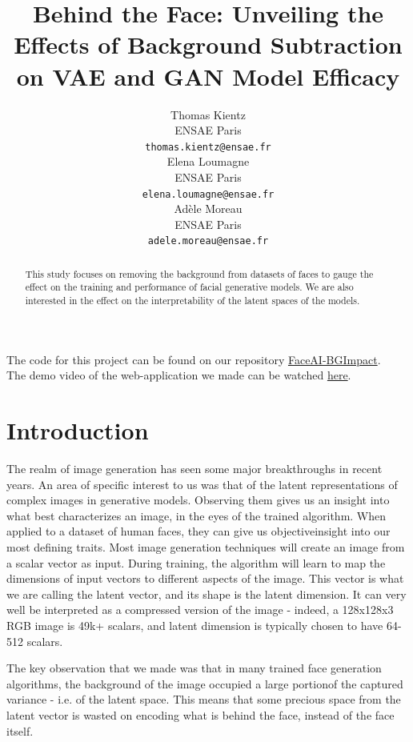 \documentclass{article}
\title{Behind the Face: Unveiling the Effects of Background Subtraction on VAE and GAN Model Efficacy}
\author{%
  Thomas Kientz \\
  ENSAE Paris\\
  \texttt{thomas.kientz@ensae.fr} \\
  \And
  Elena Loumagne \\
  ENSAE Paris\\
  \texttt{elena.loumagne@ensae.fr} \\
  \AND
  Adèle Moreau \\
  ENSAE Paris\\
  \texttt{adele.moreau@ensae.fr} \\
}
\begin{document}
\maketitle

\begin{abstract}
  This study focuses on removing the background from datasets of faces to gauge the effect on the training and performance of facial generative models. We are also interested in the effect on the interpretability of the latent spaces of the models. 
\end{abstract}

The code for this project can be found on our repository \href{https://github.com/thomktz/FaceAI-BGImpact}{FaceAI-BGImpact}. \\
The demo video of the web-application we made can be watched \href{https://www.youtube.com/watch?v=BU1d8SxDASY}{here}.

\section{Introduction}

\quad The realm of image generation has seen some major breakthroughs in recent years. 
An area of specific interest to us was that of the latent representations of complex images in generative models. 
Observing them gives us an insight into what best characterizes an image, in the eyes of the trained algorithm. 
When applied to a dataset of human faces, they can give us objective\footnotemark insight into our most defining traits.
Most image generation techniques will create an image from a scalar vector as input. 
During training, the algorithm will learn to map the dimensions of input vectors to different aspects of the image. 
This vector is what we are calling the latent vector, and its shape is the latent dimension. 
It can very well be interpreted as a compressed version of the image - indeed, a 128x128x3 RGB image is 49k+ scalars, and latent dimension is typically chosen to have 64-512 scalars. 

The key observation that we made was that in many trained face generation algorithms, the background of the image occupied a large portion\footnotemark of the captured variance - i.e. of the latent space. 
This means that some precious space from the latent vector is wasted on encoding what is behind the face, instead of the face itself. 
\end{document}
